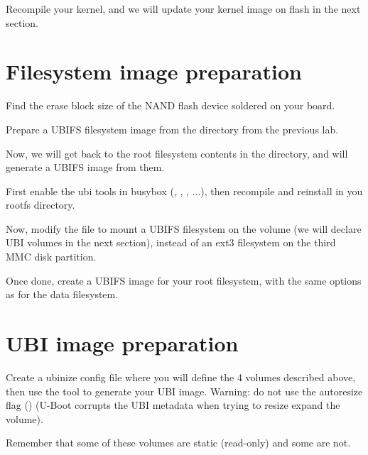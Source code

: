 Recompile your kernel, and we will update your kernel image on flash
in the next section.

\section{Filesystem image preparation}

Find the erase block size of the NAND flash device soldered on your
board.

Prepare a UBIFS filesystem image from the 
directory from the previous lab.

Now, we will get back to the root filesystem contents in the
 directory, and will generate a UBIFS image from them.

First enable the ubi tools in busybox (,
, , ...), then recompile and reinstall
 in you rootfs directory.

Now, modify the  file to mount a UBIFS filesystem
on the  volume (we will declare UBI volumes in the next
section), instead of an ext3 filesystem on the third MMC disk partition.

Once done, create a UBIFS image for your root filesystem, with the same
options as for the data filesystem.

\section{UBI image preparation}

Create a ubinize config file where you will define the 4 volumes
described above, then use the  tool to generate your
UBI image.
Warning: do not use the autoresize flag ()
(U-Boot corrupts the UBI metadata when trying to resize expand the
volume).

Remember that some of these volumes are static (read-only) and some are
not.

%
%

%
%
%
%
%
%

